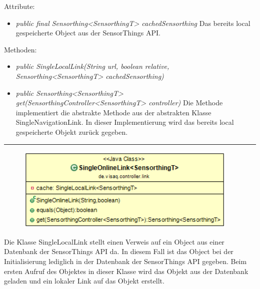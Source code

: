 Attribute:
\begin{itemize}
    \item \emph{public final Sensorthing<SensorthingT> cachedSensorthing} Das bereits local gespeicherte Object aus der \gls{SensorThings API}.
\end{itemize}
Methoden:
\begin{itemize}
    \item \emph{public SingleLocalLink(String url, boolean relative, Sensorthing<SensorthingT> cachedSensorthing)}
    \relativeDescription
    \item \emph{public Sensorthing<SensorthingT> get(SensorthingController<SensorthingT> controller)}
    Die Methode implementiert die abstrakte Methode aus der abstrakten Klasse SingleNavigationLink. In dieser Implementierung wird das bereits local gespeicherte Objekt zurück gegeben.
\end{itemize}

\rule{\textwidth}{0.4pt}
\begin{minipage}{0.4\textwidth}
    \begin{figure}[H]
        {\centering\includegraphics[width=0.95\textwidth]{media/backend/controller/classes/SingleOnlineLink.png}}
    \end{figure}
    \end{minipage} \hfill
\begin{minipage}{0.6\textwidth}
    Die Klasse SingleLocalLink stellt einen Verweis auf ein Object aus einer Datenbank der \gls{SensorThings API} da.
    In diesem Fall ist das Object bei der Initialisierung lediglich in der Datenbank der \gls{SensorThings API} gegeben.
    Beim ersten Aufruf des Objektes in dieser Klasse wird das Objekt aus der Datenbank geladen und ein lokaler Link auf das Objekt erstellt.
\end{minipage}

